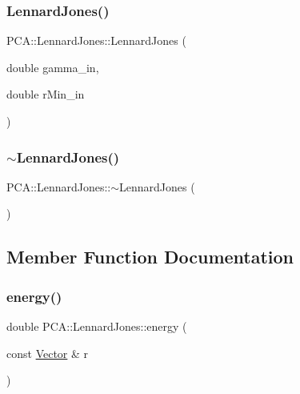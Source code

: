 \subsubsection{\texorpdfstring{Lennard\+Jones()}{LennardJones()}}
{\footnotesize\ttfamily P\+C\+A\+::\+Lennard\+Jones\+::\+Lennard\+Jones (\begin{DoxyParamCaption}\item[{double}]{gamma\+\_\+in,  }\item[{double}]{r\+Min\+\_\+in }\end{DoxyParamCaption})}

\hypertarget{class_p_c_a_1_1_lennard_jones_ac8acfe0ebd2e7f263d6561ab515f0028}{}\label{class_p_c_a_1_1_lennard_jones_ac8acfe0ebd2e7f263d6561ab515f0028} 
\subsubsection{\texorpdfstring{$\sim$\+Lennard\+Jones()}{~LennardJones()}}
{\footnotesize\ttfamily P\+C\+A\+::\+Lennard\+Jones\+::$\sim$\+Lennard\+Jones (\begin{DoxyParamCaption}{ }\end{DoxyParamCaption})}



\subsection{Member Function Documentation}
\hypertarget{class_p_c_a_1_1_lennard_jones_aa3ccc6cb511c3a10b1982c965a69e5be}{}\label{class_p_c_a_1_1_lennard_jones_aa3ccc6cb511c3a10b1982c965a69e5be} 
\subsubsection{\texorpdfstring{energy()}{energy()}}
{\footnotesize\ttfamily double P\+C\+A\+::\+Lennard\+Jones\+::energy (\begin{DoxyParamCaption}\item[{const \hyperlink{class_p_c_a_1_1_vector}{Vector} \&}]{r }\end{DoxyParamCaption})}




